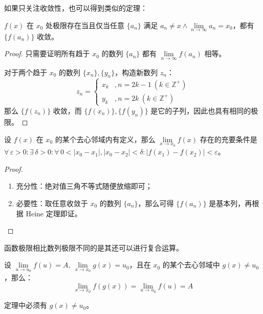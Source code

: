 如果只关注收敛性，也可以得到类似的定理：

\begin{theorem}
	$f(x)$ 在 $x_0$ 处极限存在当且仅当任意 $\{a_n\}$ 满足 $a_n \neq x \land \lim\limits_{n \to \infty} a_n = x_0$，都有 $\{f(a_n)\}$ 收敛。

	\begin{proof}
		只需要证明所有趋于 $x_0$ 的数列 $\{a_n\}$ 都有 $\lim\limits_{n \to \infty} f(a_n)$ 相等。

		对于两个趋于 $x_0$ 的数列 $\{x_n\},\{y_n\}$，构造新数列 $z_n$：
		$$
		z_n = \begin{cases}
			x_k & , n = 2k - 1\ (k \in \mathbb{Z}^+) \\
			y_k & , n = 2k\ (k \in \mathbb{Z}^+)
		\end{cases}
		$$
		那么 $\{f(z_n)\}$ 收敛，而 $\{f(x_n)\},\{f(y_n)\}$ 是它的子列，因此也具有相同的极限。
	\end{proof}
\end{theorem}

\begin{theorem}
	设 $f(x)$ 在 $x_0$ 的某个去心邻域内有定义，那么 $\lim\limits_{x \to x_0} f(x)$ 存在的充要条件是 $\forall\,\varepsilon > 0: \exists\,\delta > 0: \forall\,0 < |x_0 - x_1|,|x_0 - x_2| < \delta: |f(x_1) - f(x_2)| < \varepsilon$。

	\begin{proof}
		\begin{enumerate}
			\item 充分性：绝对值三角不等式随便放缩即可；
			\item 必要性：取任意收敛于 $x_0$ 的数列 $\{a_n\}$，那么可得 $\{f(a_n)\}$ 是基本列，再根据 Heine 定理即证。
		\end{enumerate}
	\end{proof}
\end{theorem}

函数极限相比数列极限不同的是其还可以进行复合运算。

\begin{theorem}[复合函数的极限]
	设 $\lim\limits_{u \to u_0} f(u) = A,\ \lim\limits_{x \to x_0} g(x) = u_0$，且在 $x_0$ 的某个去心邻域中 $g(x) \neq u_0$，那么：
	$$
	\lim_{x \to x_0} f(g(x)) = \lim_{u \to u_0} f(u) = A
	$$
\end{theorem}

定理中必须有 $g(x) \neq u_0$。